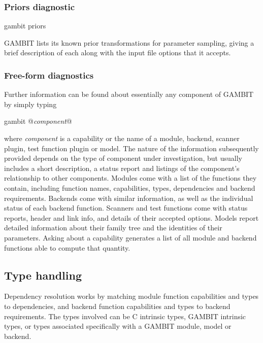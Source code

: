 \documentclass[pdftex,twocolumn,epjc3_preprint,runningheads]{svjour3}
\renewcommand{\_}{\discretionary{\underscore}{}{\underscore}}
\newcommand{\metavarf}[1]{\textit{\color{darkgreen}\footnotesize\textrm{#1}}}
\newcommand{\metavar}{\metavarf}
\newcommand{\gambit}{\textsf{GAMBIT}\xspace}
\newcommand{\GB}{\gambit}
\newcommand\xx{\raisebox{0.2ex}{\smaller ++}\xspace}
\newcommand\Cpp{\textsf{C\xx}\xspace}
\begin{document}
\subsubsection{Priors diagnostic}
\label{priors diagnostic}

\begin{lstterm}
gambit priors
\end{lstterm}
\GB lists its known prior transformations for parameter sampling, giving a brief description of each along with the input file options that it accepts.

\subsubsection{Free-form diagnostics}
\label{free-form diagnostic}

Further information can be found about essentially any component of \GB by simply typing
\begin{lstterm}
gambit @\metavar{component}@
\end{lstterm}
where \metavar{component} is a capability or the name of a module, backend, scanner plugin, test function plugin or model.  The nature of the information subsequently provided depends on the type of component under investigation, but usually includes a short description, a status report and listings of the component's relationship to other components.  Modules come with a list of the functions they contain, including function names, capabilities, types, dependencies and backend requirements.  Backends come with similar information, as well as the individual status of each backend function. Scanners and test functions come with status reports, header and link info, and details of their accepted options.  Models report detailed information about their family tree and the identities of their parameters.  Asking about a capability generates a list of all module and backend functions able to compute that quantity.

\subsection{Type handling}
\label{types}

Dependency resolution works by matching module function capabilities and types to dependencies, and backend function capabilities and types to backend requirements.  The types involved can be \Cpp intrinsic types, \GB intrinsic types, or types associated specifically with a \GB module, model or backend.
\end{document}
